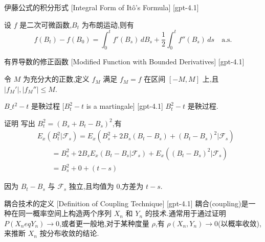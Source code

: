 \documentclass[UTF8]{ctexart}
\begin{document}
    
    
    \begin{thm}
        {伊藤公式的积分形式}
        [Integral Form of Itô's Formula]
        [gpt-4.1]
        
设 $f$ 是二次可微函数,$B_t$ 为布朗运动,则有
\[
f(B_{t}) - f(B_{0}) = \int_{0}^{t} f'(B_{s})\, dB_{s} + \frac{1}{2} \int_{0}^{t} f''(B_{s})\, ds \quad \mathrm{a.s.}
\]

    \end{thm}
    
    
    
    \begin{dfn}
        {有界导数的修正函数}
        [Modified Function with Bounded Derivatives]
        [gpt-4.1]
        
令 $M$ 为充分大的正数,定义 $f_{M}$ 满足 $f_{M} = f$ 在区间 $[-M, M]$ 上,且 $|f_{M}'|, |f_{M}''| \le M$.

    \end{dfn}
    
    
    
    \begin{thm}
        [$B-{t}^{2}---t$-is-a-martingale]
        {$B\_{t}^{2} - t$ 是鞅过程}
        [$B_{t}^{2} - t$ is a martingale]
        [gpt-4.1]
        $B_{t}^{2} - t$ 是鞅过程.

证明 写出 $B_{t}^{2} = (B_{s} + B_{t} - B_{s})^{2}$,有
\[
\begin{array}{rl}
& E_{x}(B_{t}^{2} | \mathcal{F}_{s}) = E_{x}(B_{s}^{2} + 2 B_{s}(B_{t} - B_{s}) + (B_{t} - B_{s})^{2} | \mathcal{F}_{s}) \\
& \qquad = B_{s}^{2} + 2 B_{s} E_{x}(B_{t} - B_{s} | \mathcal{F}_{s}) + E_{x}((B_{t} - B_{s})^{2} | \mathcal{F}_{s}) \\
& \qquad = B_{s}^{2} + 0 + (t - s)
\end{array}
\]

因为 $B_{t} - B_{s}$ 与 $\mathcal{F}_{s}$ 独立,且均值为 0,方差为 $t-s$.

    \end{thm}
    
    
    
    \begin{dfn}
        {耦合技术的定义}
        [Definition of Coupling Technique]
        [gpt-4.1]
        耦合(coupling)是一种在同一概率空间上构造两个序列 $X_{n}$ 和 $Y_{n}$ 的技术.通常用于通过证明 $P(X_{n} 
eq Y_{n}) \to 0$,或者更一般地,对于某种度量 $\rho$,有 $\rho(X_{n}, Y_{n}) \to 0$(以概率收敛),来推断 $X_{n}$ 按分布收敛的结论.
    \end{dfn}
    
\end{document}
